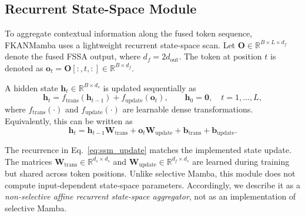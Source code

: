 \documentclass{ieeeaccess}
\begin{document}
\subsection{Recurrent State-Space Module}
\label{sec:ssm}

To aggregate contextual information along the fused token sequence, FKANMamba uses a lightweight recurrent state-space scan. Let
$\mathbf{O}\in\mathbb{R}^{B\times L\times d_f}$ denote the fused FSSA output, where $d_f=2d_{\mathrm{out}}$. The token at position $t$ is denoted as
$\mathbf{o}_{t}=\mathbf{O}[:,t,:]\in\mathbb{R}^{B\times d_f}$.

A hidden state $\mathbf{h}_{t}\in\mathbb{R}^{B\times d_s}$ is updated sequentially as
\begin{equation}
\mathbf{h}_{t}
=
f_{\mathrm{trans}}(\mathbf{h}_{t-1})
+
f_{\mathrm{update}}(\mathbf{o}_{t}),
\qquad
\mathbf{h}_{0}=\mathbf{0},
\quad
t=1,\ldots,L,
\label{eq:ssm_update_general}
\end{equation}
where $f_{\mathrm{trans}}(\cdot)$ and $f_{\mathrm{update}}(\cdot)$ are learnable dense transformations. Equivalently, this can be written as
\begin{equation}
\mathbf{h}_{t}
=
\mathbf{h}_{t-1}\mathbf{W}_{\mathrm{trans}}
+
\mathbf{o}_{t}\mathbf{W}_{\mathrm{update}}
+
\mathbf{b}_{\mathrm{trans}}
+
\mathbf{b}_{\mathrm{update}}.
\label{eq:ssm_update}
\end{equation}

The recurrence in Eq.~\eqref{eq:ssm_update} matches the implemented state update. The matrices $\mathbf{W}_{\mathrm{trans}}\in\mathbb{R}^{d_s\times d_s}$ and $\mathbf{W}_{\mathrm{update}}\in\mathbb{R}^{d_f\times d_s}$ are learned during training but shared across token positions. Unlike selective Mamba, this module does not compute input-dependent state-space parameters. Accordingly, we describe it as a \emph{non-selective affine recurrent state-space aggregator}, not as an implementation of selective Mamba.
\end{document}
